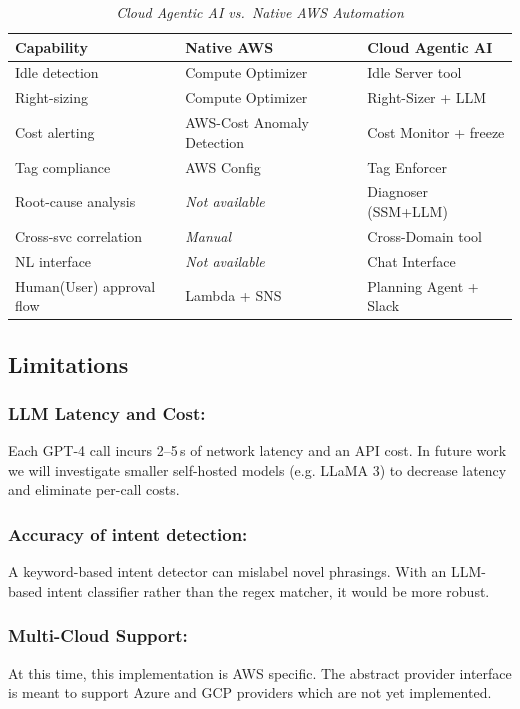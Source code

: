 \documentclass{ieeeaccess}
\begin{document}
\begin{table}[ht]
\caption{\textit{Cloud Agentic AI vs.\ Native AWS Automation}}
\centering
\setlength{\tabcolsep}{3pt}
\begin{tabular}{p{2.3cm}p{2.4cm}p{2.2cm}}
\toprule
\textbf{Capability} & \textbf{Native AWS} & \textbf{Cloud Agentic AI} \\
\midrule
Idle detection       & Compute Optimizer       & Idle Server tool \\
Right-sizing         & Compute Optimizer       & Right-Sizer + LLM \\
Cost alerting        & AWS-Cost Anomaly Detection  & Cost Monitor + freeze \\
Tag compliance       & AWS Config              & Tag Enforcer \\
Root-cause analysis  & \textit{Not available}  & Diagnoser (SSM+LLM) \\
Cross-svc correlation& \textit{Manual}          & Cross-Domain tool \\
NL interface         & \textit{Not available}  & Chat Interface \\
Human(User) approval flow  & Lambda + SNS            & Planning Agent + Slack \\
\bottomrule
\end{tabular}
\label{tab:comparison}
\end{table}

\subsection{Limitations}

\subsubsection{LLM Latency and Cost:} Each GPT-4 call incurs 2--5\,s of network
latency and an API cost. In future work we will investigate smaller self-hosted models (e.g. LLaMA 3) to decrease latency and eliminate per-call costs.

\subsubsection{Accuracy of intent detection:} A keyword-based intent detector can mislabel novel phrasings. With an LLM-based intent classifier rather than the regex matcher, it would be more robust.

\subsubsection{Multi-Cloud Support:} At this time, this implementation is AWS specific. The abstract provider interface is meant to support Azure and GCP providers which are not yet implemented.
\end{document}
